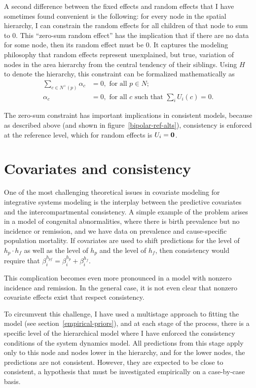 A second difference between the fixed effects and random effects that
I have sometimes found convenient is
the following: for every node in the spatial hierarchy, I can
constrain the random
effects for all children of that node to sum to $0$.  This ``zero-sum
random effect'' has the implication that if there
are no data for some node, then its random effect must be $0$.  It
captures the modeling philosophy that random effects represent
unexplained, but true, variation of nodes in the area hierarchy from
the central tendency of their siblings.  Using $H$ to denote the
hierarchy, this constraint can be formalized mathematically as
\begin{align*}
\sum_{c\in N^+(p)} \alpha_c &= 0, \text{ for all } p \in N;\\
\alpha_c &=0, \text{ for all $c$ such that } \sum_{i} U_i(c) = 0.
\end{align*}

The zero-sum constraint has important implications in consistent
models, because as described above (and shown in
figure~\ref{bipolar-ref-alts}), consistency is enforced at the
reference level, which for random effects is $U_i = \mathbf{0}$.


\section{Covariates and consistency}
One of the most challenging theoretical issues in covariate modeling
for integrative systems modeling is the interplay between the
predictive covariates and the intercompartmental consistency.  A
simple example of the problem arises in a model of congenital
abnormalities, where there is birth prevalence but no incidence or
remission, and we have data on prevalence and cause-specific population
mortality. If covariates are used to shift predictions for the level
of $h_{p}\cdot h_{f}$ as well as the level of $h_{p}$ and the level of $h_{f}$, then
consistency would require that $\beta^{h_{pf}}_i = \beta^{h_p}_i + \beta^{h_f}_i$.

This complication becomes even more pronounced in a model with
nonzero incidence and remission.  In the general case, it is not
even clear that nonzero covariate effects exist that respect
consistency.

To circumvent this challenge, I have used a multistage approach to
fitting the model (see section~\ref{empirical-priors}), and at each
stage of the process, there is a specific level of the hierarchical
model where I have enforced the consistency conditions of the system
dynamics model.  All predictions from this stage apply only to this
node and nodes lower in the hierarchy, and for the lower nodes, the
predictions are not consistent.  However, they are expected to
be close to consistent, a hypothesis that must be investigated
empirically on a case-by-case basis.

